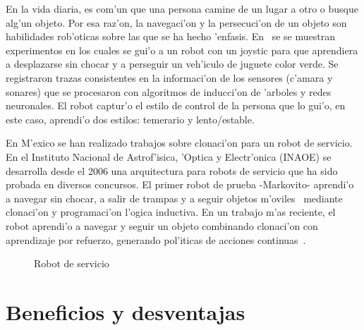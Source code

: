 \documentclass[11pt]{article}
\begin{document}
En la vida diaria, es com'un que una persona camine de un lugar a otro o busque alg'un objeto. Por esa raz'on, la navegaci'on y la persecuci'on de un objeto son habilidades rob'oticas sobre las que se ha hecho 'enfasis. En~\cite{deste:cloning} se se muestran experimentos en los cuales se gui'o a un robot con un joystic para que aprendiera a desplazarse sin chocar y a perseguir un veh'iculo de juguete color verde. Se registraron trazas consistentes en la informaci'on de los sensores (c'amara y sonares) que se procesaron con algoritmos de inducci'on de 'arboles y redes neuronales. El robot captur'o el estilo de control de la persona que lo gui'o, en este caso, aprendi'o dos estilos: temerario y lento/estable. 

En M'exico se han realizado trabajos sobre clonaci'on para un robot de servicio. En el Instituto Nacional de Astrof'isica, 'Optica y Electr'onica (INAOE) se desarrolla desde el 2006 una arquitectura para robots de servicio que ha sido probada en diversos concursos. El primer robot de prueba -Markovito- aprendi'o a navegar sin chocar, a salir de trampas y a seguir objetos m'oviles~\cite{trps:icm09,mkvito:ieee} mediante clonaci'on y programaci'on l'ogica inductiva. En un trabajo m'as reciente, el robot aprendi'o a navegar y seguir un objeto combinando clonaci'on con aprendizaje por refuerzo, generando pol'iticas de acciones continuas~\cite{rljulioed}.


\begin{figure}[h]
\begin{center}

\caption{Robot de servicio}
  \label{fig:robotservicio}
\end{center}
\end{figure} 


\section{Beneficios y desventajas}
\end{document}
